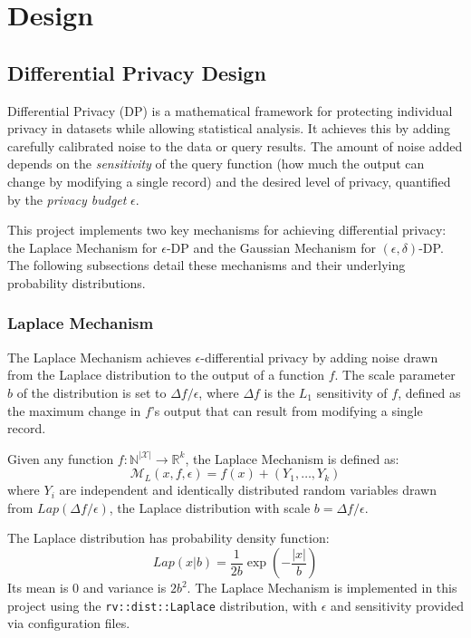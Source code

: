 \chapter{Design\label{chap:design}}
\section{Differential Privacy Design}
Differential Privacy (DP) is a mathematical framework for protecting individual privacy in datasets while allowing statistical analysis. It achieves this by adding carefully calibrated noise to the data or query results. The amount of noise added depends on the \textit{sensitivity} of the query function (how much the output can change by modifying a single record) and the desired level of privacy, quantified by the \textit{privacy budget} $\epsilon$. 

This project implements two key mechanisms for achieving differential privacy: the Laplace Mechanism for $\epsilon$-DP and the Gaussian Mechanism for $(\epsilon, \delta)$-DP. The following subsections detail these mechanisms and their underlying probability distributions.

\subsection{Laplace Mechanism}
The Laplace Mechanism achieves $\epsilon$-differential privacy by adding noise drawn from the Laplace distribution to the output of a function $f$. The scale parameter $b$ of the distribution is set to $\Delta f / \epsilon$, where $\Delta f$ is the $L_1$ sensitivity of $f$, defined as the maximum change in $f$'s output that can result from modifying a single record.

\begin{definition}
Given any function $f: \mathbb{N}^{|\mathcal{X}|} \rightarrow \mathbb{R}^k$, the Laplace Mechanism is defined as:
\begin{equation}
\mathcal{M}_L(x, f, \epsilon) = f(x) + (Y_1, \ldots, Y_k)
\end{equation}
where $Y_i$ are independent and identically distributed random variables drawn from $Lap(\Delta f/\epsilon)$, the Laplace distribution with scale $b = \Delta f/\epsilon$\citep[Def. 3.3]{Dwork2014}.
\end{definition}

The Laplace distribution has probability density function:
\begin{equation}
Lap(x | b) = \frac{1}{2b} \exp\left(-\frac{|x|}{b}\right) 
\end{equation}
Its mean is 0 and variance is $2b^2$\citep[Def. 3.2]{Dwork2014}. The Laplace Mechanism is implemented in this project using the \texttt{rv::dist::Laplace} distribution, with $\epsilon$ and sensitivity provided via configuration files.

